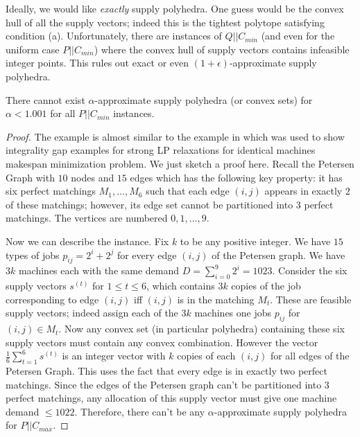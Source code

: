 Ideally, we would like {\em exactly} supply polyhedra. One guess would be the convex hull of all the supply vectors; indeed this is the tightest polytope satisfying condition (a).
Unfortunately, there are instances of $Q||C_{min}$ (and even for the uniform case $P||C_{min}$) where the convex hull of supply vectors contains infeasible integer points.
This rules out exact or even $(1+\epsilon)$-approximate supply polyhedra.
\begin{theorem}\label{thm:no-supp}
	There cannot exist $\alpha$-approximate supply polyhedra (or convex sets) for $\alpha < 1.001$ for all  $P||C_{min}$ instances.
\end{theorem}
\begin{proof}
The example is almost similar to the example in \cite{KurpiszMMMVW16} which was used to show integrality gap examples for strong LP relaxations for identical machines makespan minimization problem.
We just sketch a proof here. Recall the Petersen Graph with $10$ nodes and $15$ edges which has the following key property: it has six perfect matchings $M_1,\ldots,M_6$ such that each edge $(i,j)$ appears in exactly $2$ of these matchings; however, its edge set cannot be partitioned into $3$ perfect matchings.
The vertices are numbered $0,1,\ldots,9$.

Now we can describe the instance. Fix $k$ to be any positive integer.
We have $15$ types of jobs $p_{ij} = 2^i + 2^j$ for every edge $(i,j)$ of the Petersen graph.
We have $3k$ machines each with the same demand $D = \sum_{i=0}^9 2^i = 1023$.
Consider the six supply vectors $s^{(t)}$ for $1\leq t\leq 6$,  which contains $3k$ copies of the job corresponding to edge $(i,j)$ iff $(i,j)$ is in the matching $M_t$.
These are feasible supply vectors; indeed assign each of the $3k$ machines one jobs $p_{ij}$ for $(i,j) \in M_t$. Now any convex set (in particular polyhedra) containing these six supply vectors
must contain any convex combination. However the vector $\frac{1}{6}\sum_{t=1}^6 s^{(t)}$ is an integer vector with $k$ copies of each $(i,j)$ for all edges of the Petersen Graph.
This uses the fact that every edge is in exactly two perfect matchings. Since the edges of the  Petersen graph can't be partitioned into $3$ perfect matchings, any allocation of this supply vector
must give one machine demand $\leq 1022$. Therefore, there can't be any $\alpha$-approximate supply polyhedra for $P||C_{max}$.
\end{proof}
